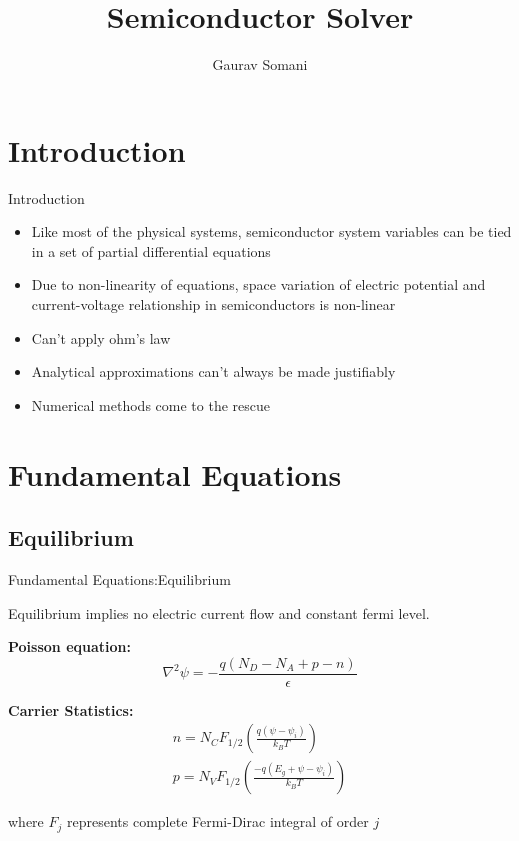 \documentclass{beamer}
\title[Semiconductor Solver]{Semiconductor Solver}
\author{Gaurav Somani}
\institute{CeNSE, IISc}
\begin{document}
\begin{frame}
  \titlepage
\end{frame}


\section{Introduction}

\begin{frame}{Introduction}

\begin{itemize}
  \item Like most of the physical systems, semiconductor system variables can be tied in a set of partial differential equations	  
  \item Due to non-linearity of equations, space variation of electric potential and current-voltage relationship in semiconductors is non-linear
  \item Can't apply ohm's law
  \item Analytical approximations can't always be made justifiably
  \item Numerical methods come to the rescue 
\end{itemize}

\end{frame}

\section{Fundamental Equations}

\subsection{Equilibrium}


\begin{frame}{Fundamental Equations:Equilibrium}

Equilibrium implies no electric current flow and constant fermi level.

\textbf{Poisson equation:}
\begin{equation}
\nabla^2 \psi = -\frac{q(N_D - N_A + p - n)}{\epsilon} \tag{1} \label{eq:1}
\end{equation} 

\textbf{Carrier Statistics:}
\begin{align*}
n = N_C F_{1/2}\left(\frac{q(\psi-\psi_i)}{k_BT}\right) \\
p = N_V F_{1/2}\left(\frac{-q(E_g+\psi-\psi_i)}{k_BT}\right) \tag{2} \label{eq:2}
\end{align*}

where $F_j$ represents complete Fermi-Dirac integral of order $j$

\end{frame}
\end{document}

